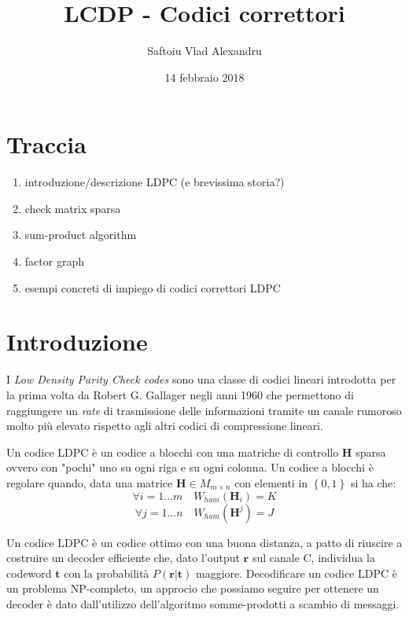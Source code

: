 \documentclass{article}
\title{LCDP - Codici correttori}
\date{14 febbraio 2018}
\author{Saftoiu Vlad Alexandru}
\begin{document}
	\maketitle
	\newpage

	\tableofcontents
	\newpage


	\section{Traccia}
	\begin{enumerate}
		\item introduzione/descrizione LDPC (e brevissima storia?)
		\item check matrix sparsa 
		\item sum-product algorithm
		\item factor graph
		\item esempi concreti di impiego di codici correttori LDPC
	\end{enumerate}

	\section{Introduzione}
	I \textit{Low Density Parity Check codes} sono una classe di codici lineari introdotta per la prima volta da Robert G. Gallager negli anni 1960 che permettono di raggiungere un \textit{rate} di trasmissione delle informazioni tramite un canale rumoroso molto più elevato rispetto agli altri codici di compressione lineari.
	
	Un codice LDPC è un codice a blocchi con una matriche di controllo $\textbf{H}$ sparsa ovvero con "pochi" uno su ogni riga e su ogni colonna. Un codice a blocchi è regolare quando, data una matrice $\textbf{H} \in M_{m \times n}$ con elementi in $\left\{0,1\right\}$ si ha che:
	\begin{equation}
		\forall i = 1 ... m \quad W_{ham}(\textbf{H}_i) = K
	\end{equation}
	\begin{equation}
		  \forall j =1 ... n \quad W_{ham}(\textbf{H}^j) = J 
	\end{equation}
	
	Un codice LDPC è un codice ottimo con una buona distanza, a patto di riuscire a costruire un decoder efficiente che, dato l'output $\textbf{r}$ sul canale C, individua la codeword $\textbf{t}$ con la probabilità $P(\textbf{r}|\textbf{t})$ maggiore. Decodificare un codice LDPC è un problema NP-completo, un approcio che possiamo seguire per ottenere un decoder è dato dall'utilizzo dell'algoritmo somme-prodotti a scambio di messaggi.
	
\end{document}
